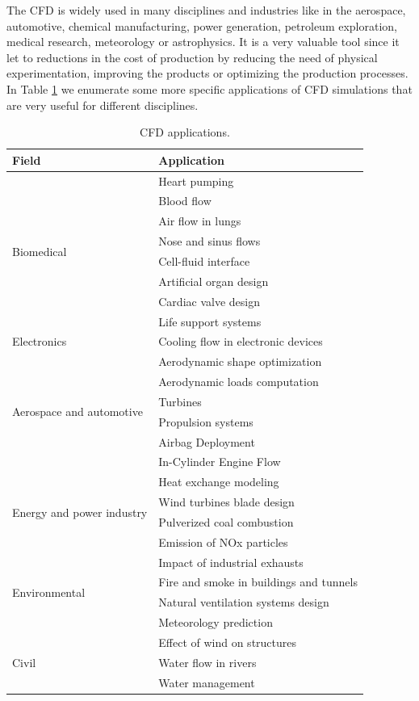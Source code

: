 The CFD is widely used in many disciplines and industries like in the aerospace, automotive, chemical manufacturing, power generation, petroleum exploration, medical research, meteorology or astrophysics. It is a very valuable tool since it let to reductions in the cost of production by reducing the need of physical experimentation, improving the products or optimizing the production processes. In Table \ref{table-CFD_applications} we enumerate some more specific applications of CFD simulations that are very useful for different disciplines.
\begin{table}[h]
\centering
\begin{tabular}{ll}
\toprule
Field&Application\\
\midrule
\midrule
\multirow{8}{*}{Biomedical}&Heart pumping\\
&Blood flow\\
&Air flow in lungs\\
&Nose and sinus flows\\
&Cell-fluid interface\\
&Artificial organ design\\
&Cardiac valve design\\
&Life support systems\\
\midrule
\multirow{1}{*}{Electronics}&Cooling flow in electronic devices\\
\midrule
\multirow{6}{*}{Aerospace and automotive}&Aerodynamic shape optimization\\
&Aerodynamic loads computation\\
&Turbines\\
&Propulsion systems\\
&Airbag Deployment\\
&In-Cylinder Engine Flow\\
\midrule
\multirow{4}{*}{Energy and power industry}&Heat exchange modeling\\
&Wind turbines blade design\\
&Pulverized coal combustion\\
&Emission of NOx particles\\
\midrule
\multirow{4}{*}{Environmental}&Impact of industrial exhausts\\
&Fire and smoke in buildings and tunnels\\
&Natural ventilation systems design\\
&Meteorology prediction\\
\midrule
\multirow{4}{*}{Civil}&Effect of wind on structures\\
&Water flow in rivers\\
&Water management\\
\bottomrule
\end{tabular}
\caption{CFD applications.}
\label{table-CFD_applications}
\end{table}


